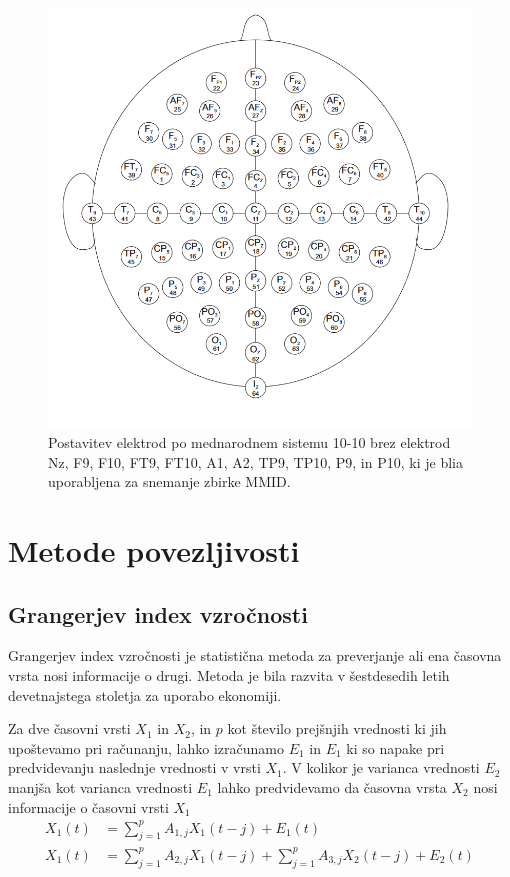 \begin{figure}[h!]
    \begin{center}
    \includegraphics[width=1\linewidth]{slike/64electrodeSystem.png}
    \end{center}
    \caption{Postavitev elektrod po mednarodnem sistemu 10-10 brez elektrod Nz, F9, F10, FT9, FT10, A1, A2, TP9, TP10, P9, in P10, ki je blia uporabljena za snemanje zbirke MMID. \cite{HttpsWwwPhysionet}}
    \end{figure}
\section{Metode povezljivosti}
\subsection{Grangerjev index vzročnosti}
Grangerjev index vzročnosti je statistična metoda za preverjanje ali ena časovna vrsta nosi informacije o drugi. Metoda je bila razvita v šestdesedih letih devetnajstega stoletja za uporabo ekonomiji.

Za dve časovni vrsti $X_1$ in $X_2$, in $p$ kot število prejšnjih vrednosti ki jih upoštevamo pri računanju, lahko izračunamo $E_1$ in $E_1$ ki so napake pri predvidevanju naslednje vrednosti v vrsti $X_1$. V kolikor je varianca vrednosti $E_2$ manjša kot varianca vrednosti $E_1$ lahko predvidevamo da časovna vrsta $X_2$ nosi informacije o časovni vrsti $X_1$
\begin{align*}
X_1(t) &= \sum_{j=1}^{p} A_{1,j} X_1(t-j) + E_1(t)\\
X_1(t) &= \sum_{j=1}^{p} A_{2,j} X_1(t-j) + \sum_{j=1}^{p} A_{3,j} X_2(t-j) + E_2(t)
\end{align*}


